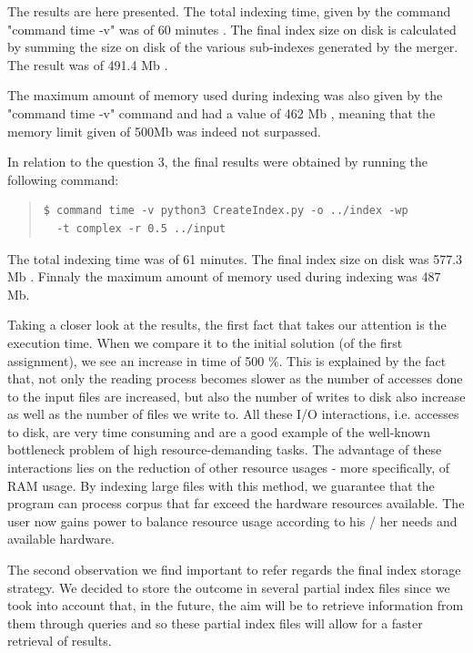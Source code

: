 \documentclass[12pt]{article}
\begin{document}
The results are here presented. The total indexing time, given by the command
"command time -v" was of 60 minutes . 
The final index size on disk is calculated by summing the size on disk of the 
various sub-indexes generated by the merger. 
The result was of 491.4 Mb .

The maximum amount of memory used during indexing was also given by the 
"command time -v" command and had a value of 462 Mb , meaning that
the memory limit given of 500Mb was indeed not surpassed.

In relation to the question 3, the final results were obtained by running the 
following command:

\begingroup
\addtolength\leftmargini{-0.4in}
\addtolength\baselineskip{-0.05in}
\begin{quote}
\begin{verbatim}
$ command time -v python3 CreateIndex.py -o ../index -wp 
  -t complex -r 0.5 ../input
\end{verbatim}
\end{quote}
\endgroup

The total indexing time was of 61 minutes. The final index size on disk was  577.3 Mb .
Finnaly the maximum amount of memory used during indexing was 487 Mb.

Taking a closer look at the results, the first fact that takes our attention is the
execution time.
When we compare it to the initial solution (of the first assignment), we see an
increase in time of 500 \%.
This is explained by the fact that, not only the reading process becomes slower
as the number of accesses done to the input files are increased, but also the 
number of writes to disk also increase as well as the number of files we write to.
All these I/O interactions, i.e. accesses to disk, are very time consuming and 
are a good example of the well-known bottleneck problem of high resource-demanding tasks.
The advantage of these interactions lies on the reduction of other resource usages - 
more specifically, of RAM usage. 
By indexing large files with this method, we guarantee that the program can process
corpus that far exceed the hardware resources available.
The user now gains power to balance resource usage according to his / her needs and
available hardware.

The second observation we find important to refer regards the final index storage 
strategy. We decided to store the outcome in several partial index files since we
took into account that, in the future, the aim will be to retrieve information from
them through queries and so these partial index files will allow for a faster retrieval
of results.
\end{document}
